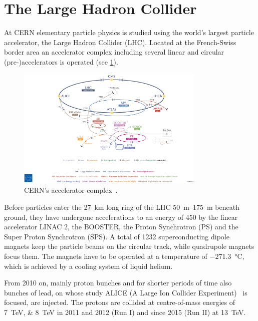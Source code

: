 
\section{The Large Hadron Collider}
\label{sec:detector:lhc}

At CERN elementary particle physics is studied using the world's largest
particle accelerator, the Large Hadron Collider (LHC). Located at the
French-Swiss border area an accelerator complex including several linear and
circular (pre-)accelerators is operated (see
\cref{fig:detector:accelerators}).
\begin{figure}
\centering
\includegraphics[width=0.8\textwidth]{04-Detector/figs/CERN_complex.pdf}
\caption{CERN's accelerator complex~\cite{Marcastel:1621583}.}
\label{fig:detector:accelerators}
\end{figure}
Before particles enter the \SI{27}{\kilo\metre} long ring of the LHC
\SIrange[range-phrase={\,to\,}]{50}{175}{m} beneath ground, they have undergone
accelerations to an energy of \SI{450}{\gev} by the linear accelerator LINAC
2, the BOOSTER, the Proton Synchrotron (PS) and the Super Proton Synchrotron
(SPS). A total of 1232 superconducting dipole magnets keep the particle beams
on the circular track, while quadrupole magnets focus them. The magnets have
to be operated at a temperature of
\SI{-271.3}{\celsius}, which is achieved by a cooling system of liquid
helium.

From 2010 on, mainly proton bunches and for shorter periods of time also
bunches of lead, on whose study ALICE (A Large Ion Collider
Experiment)~\cite{ALICE} is focused, are injected. The protons are collided at
centre-of-mass energies of \SIlist{7;8}{\TeV} in 2011 and 2012 (Run I) and
since 2015 (Run II) at \SI{13}{\TeV}.